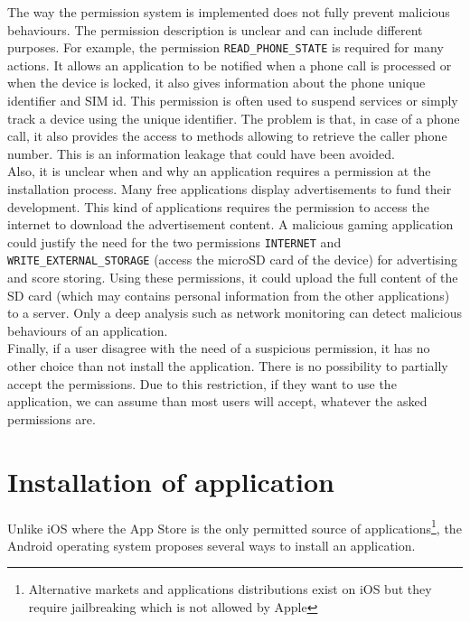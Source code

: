 The way the permission system is implemented does not fully prevent malicious behaviours.
The permission description is unclear and can include different purposes.
For example, the permission \texttt{READ\_PHONE\_STATE} is required for many actions.
It allows an application to be notified when a phone call is processed or when the device is locked, it also gives information about the phone unique identifier and SIM id.
This permission is often used to suspend services or simply track a device using the unique identifier.
The problem is that, in case of a phone call, it also provides the access to methods allowing to retrieve the caller phone number.
This is an information leakage that could have been avoided.\\

Also, it is unclear when and why an application requires a permission at the installation process.
Many free applications display advertisements to fund their development.
This kind of applications requires the permission to access the internet to download the advertisement content.
A malicious gaming application could justify the need for the two permissions \texttt{INTERNET} and \texttt{WRITE\_EXTERNAL\_STORAGE} (access the microSD card of the device) for advertising and score storing.
Using these permissions, it could upload the full content of the SD card (which may contains personal information from the other applications) to a server.
Only a deep analysis such as network monitoring can detect malicious behaviours of an application.\\

Finally, if a user disagree with the need of a suspicious permission, it has no other choice than not install the application.
There is no possibility to partially accept the permissions.
Due to this restriction, if they want to use the application, we can assume than most users will accept, whatever the asked permissions are.

\section{Installation of application}

Unlike iOS where the App Store is the only permitted source of applications\footnote{Alternative markets and applications distributions exist on iOS but they require jailbreaking which is not allowed by Apple}, the Android operating system proposes several ways to install an application.

